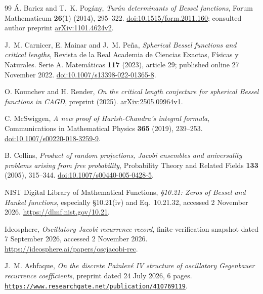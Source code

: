 \documentclass[11pt]{article}
\numberwithin{equation}{section}
\theoremstyle{remark}
\begin{document}
\begin{thebibliography}{99}
\'A. Baricz and T.~K. Pog\'any,
\emph{Tur\'an determinants of Bessel functions},
Forum Mathematicum \textbf{26}(1) (2014), 295--322.
\href{https://doi.org/10.1515/form.2011.160}{doi:10.1515/form.2011.160};
consulted author preprint
\href{https://arxiv.org/abs/1101.4624v2}{arXiv:1101.4624v2}.

J.~M. Carnicer, E. Mainar and J.~M. Pe\~na,
\emph{Spherical Bessel functions and critical lengths},
Revista de la Real Academia de Ciencias Exactas, F\'isicas y Naturales.
Serie A. Matem\'aticas \textbf{117} (2023), article 29;
published online 27 November 2022.
\href{https://doi.org/10.1007/s13398-022-01365-8}
{doi:10.1007/s13398-022-01365-8}.

O. Kounchev and H. Render,
\emph{On the critical length conjecture for spherical Bessel functions in
CAGD}, preprint (2025).
\href{https://arxiv.org/abs/2505.09964v1}{arXiv:2505.09964v1}.

C. McSwiggen,
\emph{A new proof of Harish-Chandra's integral formula},
Communications in Mathematical Physics \textbf{365} (2019), 239--253.
\href{https://doi.org/10.1007/s00220-018-3259-9}
{doi:10.1007/s00220-018-3259-9}.

B. Collins,
\emph{Product of random projections, Jacobi ensembles and universality
problems arising from free probability},
Probability Theory and Related Fields \textbf{133} (2005), 315--344.
\href{https://doi.org/10.1007/s00440-005-0428-5}
{doi:10.1007/s00440-005-0428-5}.

NIST Digital Library of Mathematical Functions,
\emph{\S10.21: Zeros of Bessel and Hankel functions},
especially \S10.21(iv) and Eq.~10.21.32, accessed 2 November 2026.
\url{https://dlmf.nist.gov/10.21}.

Ideosphere, \emph{Oscillatory Jacobi recurrence record},
finite-verification snapshot dated 7 September 2026, accessed
2 November 2026.
\url{https://ideosphere.ai/papers/oscjacobi-rec}.

J.~M. Ashfaque,
\emph{On the discrete Painlev\'e IV structure of oscillatory Gegenbauer
recurrence coefficients}, preprint dated 24 July 2026, 6 pages.
\href{https://www.researchgate.net/publication/410769119_On_the_Discrete_Painleve_IV_Structure_of_Oscillatory_Gegenbauer_Recurrence_Coefficients}
{\nolinkurl{https://www.researchgate.net/publication/410769119}}.

\end{thebibliography}
\end{document}
